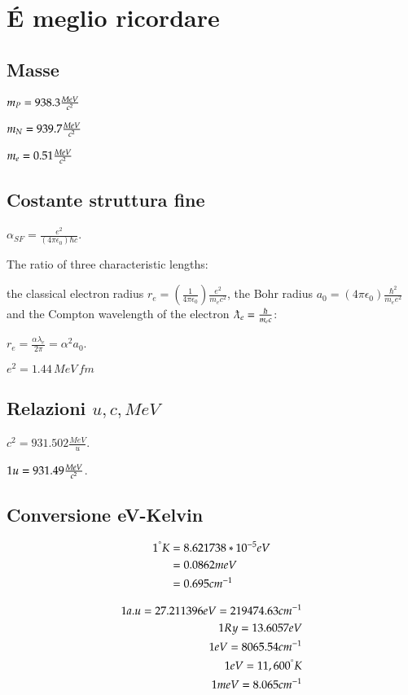 \documentclass[main.tex]{subfiles}
\begin{document}
\chapter{\'E meglio ricordare}

\section{Masse}
 \begin{itemize*}
 \item $m_P=938.3\frac{MeV}{c^2}$
\item $m_N=939.7\frac{MeV}{c^2}$
\item $m_e=0.51\frac{MeV}{c^2}$

 \end{itemize*}
 
 
 \section{Costante struttura fine}
 
 $\alpha_{SF}=\frac{e^2}{(4\pi\epsilon_0)\hbar c}$.

The ratio of three characteristic lengths:

the classical electron radius $r_e=(\frac{1}{4\pi\epsilon_0})\frac{e^2}{m_ec^2}$, the Bohr radius $a_0=(4\pi\epsilon_0)\frac{\hbar^2}{m_ee^2}$  and the Compton wavelength of the electron $\lambdabar_e=\frac{\hbar}{m_ec}$:

$r_e=\frac{\alpha\lambda_e}{2\pi}=\alpha^2a_0$.

$e^2=1.44\,MeV\,fm$

 \section{Relazioni $u,c,MeV$}
 
 $c^2=931.502\frac{MeV}{u}$.
 
 $1 u=931.49 \frac{MeV}{c^2}$.
 
 \section{Conversione eV-Kelvin}
 
\begin{align*}
1  ^{\degree}K&= 8.621738*10^{-5}  eV \\
&= 0.0862 meV \\
&= 0.695 cm^{-1}
\end{align*}

\begin{align*}
     1 a.u=27.211396 eV=219474.63 cm^{-1}\\
     1 Ry=13.6057 eV \\
     1 eV =8065.54 cm^{-1} \\
     1 eV= 11,600  ^{\degree}K\\
   1 meV = 8.065 cm^{-1}
\end{align*}
\end{document}
